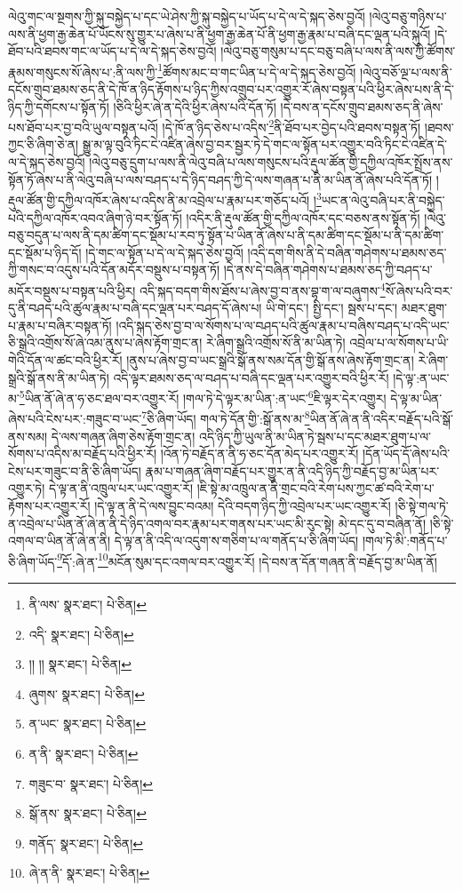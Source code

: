 ལེའུ་གང་ལ་སྔགས་ཀྱི་སྐུ་བསྐྱེད་པ་དང་ཡེ་ཤེས་ཀྱི་སྐུ་བསྐྱེད་པ་ཡོད་པ་དེ་ལ་དེ་སྐད་ཅེས་བྱའོ། །ལེའུ་བཅུ་གཉིས་པ་ལས་ནི་ཕྱག་རྒྱ་ཆེན་པོ་ཡོངས་སུ་གྱུར་པ་ཞེས་པ་ནི་ཕྱག་རྒྱ་ཆེན་པོ་ནི་ཕྱག་རྒྱ་རྣམ་པ་བཞི་དང་ལྡན་པའི་སྐུའོ། །དེ་ཐོབ་པའི་ཐབས་གང་ལ་ཡོད་པ་དེ་ལ་དེ་སྐད་ཅེས་བྱའོ། །ལེའུ་བཅུ་གསུམ་པ་དང་བཅུ་བཞི་པ་ལས་ནི་ལས་ཀྱི་ཚོགས་རྣམས་གསུངས་སོ་ཞེས་པ་:ནི་ལས་ཀྱི་\footnote{ནི་ལས་  སྣར་ཐང་།  པེ་ཅིན། }ཚོགས་མང་བ་གང་ཡིན་པ་དེ་ལ་དེ་སྐད་ཅེས་བྱའོ། །ལེའུ་བཅོ་ལྔ་པ་ལས་ནི་དངོས་གྲུབ་ཐམས་ཅད་ནི་དེ་ཁོ་ན་ཉིད་རྟོགས་པ་ཉིད་ཀྱིས་འགྲུབ་པར་འགྱུར་རོ་ཞེས་བསྟན་པའི་ཕྱིར་ཞེས་པས་ནི་དེ་ཉིད་ཀྱི་དགོངས་པ་སྟོན་ཏོ། །ཅིའི་ཕྱིར་ཞེ་ན་དེའི་ཕྱིར་ཞེས་པའི་དོན་ཏོ། །དེ་བས་ན་དངོས་གྲུབ་ཐམས་ཅད་ནི་ཞེས་པས་ཐོབ་པར་བྱ་བའི་ཡུལ་བསྟན་པའོ། །དེ་ཁོ་ན་ཉིད་ཅེས་པ་འདིས་\footnote{འདི་  སྣར་ཐང་།  པེ་ཅིན། }ནི་ཐོབ་པར་བྱེད་པའི་ཐབས་བསྟན་ཏོ། །ཐབས་ཀྱང་ཅི་ཞིག་ཅེ་ན། སྒྱུ་མ་ལྟ་བུའི་ཏིང་ངེ་འཛིན་ཞེས་བྱ་བར་སྦྱར་ཏེ་དེ་གང་ལ་སྟོན་པར་འགྱུར་བའི་ཏིང་ངེ་འཛིན་དེ་ལ་དེ་སྐད་ཅེས་བྱའོ། །ལེའུ་བཅུ་དྲུག་པ་ལས་ནི་ལེའུ་བཞི་པ་ལས་གསུངས་པའི་རྡུལ་ཚོན་གྱི་དཀྱིལ་འཁོར་སྤྲོས་ནས་སྟོན་ཏོ་ཞེས་པ་ནི་ལེའུ་བཞི་པ་ལས་བཤད་པ་དེ་ཉིད་བཤད་ཀྱི་དེ་ལས་གཞན་པ་ནི་མ་ཡིན་ནོ་ཞེས་པའི་དོན་ཏོ། །རྡུལ་ཚོན་གྱི་དཀྱིལ་འཁོར་ཞེས་པ་འདིས་ནི་མ་འབྲེལ་པ་རྣམ་པར་གཅོད་པའོ། །\footnote{།། །།  སྣར་ཐང་།  པེ་ཅིན། }ཡང་ན་ལེའུ་བཞི་པར་ནི་བསྐྱེད་པའི་དཀྱིལ་འཁོར་འབའ་ཞིག་ཉེ་བར་སྟོན་ཏོ། །འདིར་ནི་རྡུལ་ཚོན་གྱི་དཀྱིལ་འཁོར་དང་བཅས་ནས་སྟོན་ཏོ། །ལེའུ་བཅུ་བདུན་པ་ལས་ནི་དམ་ཚིག་དང་སྡོམ་པ་རབ་ཏུ་སྟོན་པ་ཡིན་ནོ་ཞེས་པ་ནི་དམ་ཚིག་དང་སྡོམ་པ་ནི་དམ་ཚིག་དང་སྡོམ་པ་ཉིད་དོ། །དེ་གང་ལ་སྟོན་པ་དེ་ལ་དེ་སྐད་ཅེས་བྱའོ། །འདི་དག་གིས་ནི་དེ་བཞིན་གཤེགས་པ་ཐམས་ཅད་ཀྱི་གསང་བ་འདུས་པའི་དོན་མདོར་བསྡུས་པ་བསྟན་ཏོ། །དེ་ནས་དེ་བཞིན་གཤེགས་པ་ཐམས་ཅད་ཀྱི་བཤད་པ་མདོར་བསྡུས་པ་བསྟན་པའི་ཕྱིར། འདི་སྐད་བདག་གིས་ཐོས་པ་ཞེས་བྱ་བ་ནས་བྷ་ག་ལ་བཞུགས་\footnote{ཞུགས་  སྣར་ཐང་།  པེ་ཅིན། }སོ་ཞེས་པའི་བར་དུ་ནི་བཤད་པའི་ཚུལ་རྣམ་པ་བཞི་དང་ལྡན་པར་བཤད་དོ་ཞེས་པ། ཡི་གེ་དང་། སྤྱི་དང་། སྦས་པ་དང་། མཐར་ཐུག་པ་རྣམ་པ་བཞིར་བསྟན་ཏོ། །འདི་སྐད་ཅེས་བྱ་བ་ལ་སོགས་པ་ལ་བཤད་པའི་ཚུལ་རྣམ་པ་བཞིས་བཤད་པ་འདི་ཡང་ཅི་སྒྲའི་འགྲོས་སོ་ཞེ་འམ་ནུས་པ་ཞེས་རྟོག་གྲང་ན། རེ་ཞིག་སྒྲའི་འགྲོས་སོ་ནི་མ་ཡིན་ཏེ། འབྲེལ་པ་ལ་སོགས་པ་ཡི་གེའི་དོན་ལ་ཚང་བའི་ཕྱིར་རོ། །ནུས་པ་ཞེས་བྱ་བ་ཡང་སྒྲའི་སྒོ་ནས་སམ་དོན་གྱི་སྒོ་ནས་ཞེས་རྟོག་གྲང་ན། རེ་ཞིག་སྒྲའི་སྒོ་ནས་ནི་མ་ཡིན་ཏེ། འདི་ལྟར་ཐམས་ཅད་ལ་བཤད་པ་བཞི་དང་ལྡན་པར་འགྱུར་བའི་ཕྱིར་རོ། །དེ་ལྟ་:ན་ཡང་མ་\footnote{ན་ཡང་  སྣར་ཐང་།  པེ་ཅིན། }ཡིན་ནོ་ཞེ་ན་ཧ་ཅང་ཐལ་བར་འགྱུར་རོ། །གལ་ཏེ་དེ་ལྟར་མ་ཡིན་:ན་ཡང་\footnote{ན་ནི་  སྣར་ཐང་།  པེ་ཅིན། }ཇི་ལྟར་དེར་འགྱུར། དེ་ལྟ་མ་ཡིན་ཞེས་པའི་ངེས་པར་:གཟུང་བ་ཡང་\footnote{གཟུང་བ་  སྣར་ཐང་།  པེ་ཅིན། }ཅི་ཞིག་ཡོད། གལ་ཏེ་དོན་གྱི་:སྒོ་ནས་མ་\footnote{སྒོ་ནས་  སྣར་ཐང་།  པེ་ཅིན། }ཡིན་ནོ་ཞེ་ན་ནི་འདིར་བརྗོད་པའི་སྒོ་ནས་སམ། དེ་ལས་གཞན་ཞིག་ཅེས་རྟོག་གྲང་ན། འདི་ཉིད་ཀྱི་ཡུལ་ནི་མ་ཡིན་ཏེ་སྦས་པ་དང་མཐར་ཐུག་པ་ལ་སོགས་པ་འདིས་མ་བརྗོད་པའི་ཕྱིར་རོ། །འོན་ཏེ་བརྗོད་ན་ནི་ཧ་ཅང་དོན་མེད་པར་འགྱུར་རོ། །དོན་ཡོད་དོ་ཞེས་པའི་ངེས་པར་གཟུང་བ་ནི་ཅི་ཞིག་ཡོད། རྣམ་པ་གཞན་ཞིག་བརྗོད་པར་གྱུར་ན་ནི་འདི་ཉིད་ཀྱི་བརྗོད་བྱ་མ་ཡིན་པར་འགྱུར་ཏེ། དེ་ལྟ་ན་ནི་འཁྲུལ་པར་ཡང་འགྱུར་རོ། །ཇི་སྟེ་མ་འཁྲུལ་ན་ནི་གྲང་བའི་རེག་པས་ཀྱང་ཚ་བའི་རེག་པ་རྟོགས་པར་འགྱུར་རོ། །དེ་ལྟ་ན་ནི་དེ་ལས་བྱུང་བའམ། དེའི་བདག་ཉིད་ཀྱི་འབྲེལ་པར་ཡང་འགྱུར་རོ། །ཅི་སྟེ་གལ་ཏེ་ན་འབྲེལ་པ་ཡིན་ནོ་ཞེ་ན་ནི་དེ་ཉིད་འགལ་བར་རྣམ་པར་གནས་པར་ཡང་མི་རུང་སྟེ། མེ་དང་དུ་བ་བཞིན་ནོ། །ཅི་སྟེ་འགལ་བ་ཡིན་ནོ་ཞེ་ན་ནི། དེ་ལྟ་ན་ནི་འདི་ལ་འདུག་ས་གཅིག་པ་ལ་གནོད་པ་ཅི་ཞིག་ཡོད། །གལ་ཏེ་མི་:གནོད་པ་ཅི་ཞིག་ཡོད་\footnote{གནོད་  སྣར་ཐང་།  པེ་ཅིན། }དོ་:ཞེ་ན་\footnote{ཞེ་ན་ནི་  སྣར་ཐང་།  པེ་ཅིན། }མངོན་སུམ་དང་འགལ་བར་འགྱུར་རོ། །དེ་བས་ན་དོན་གཞན་ནི་བརྗོད་བྱ་མ་ཡིན་ནོ། 
